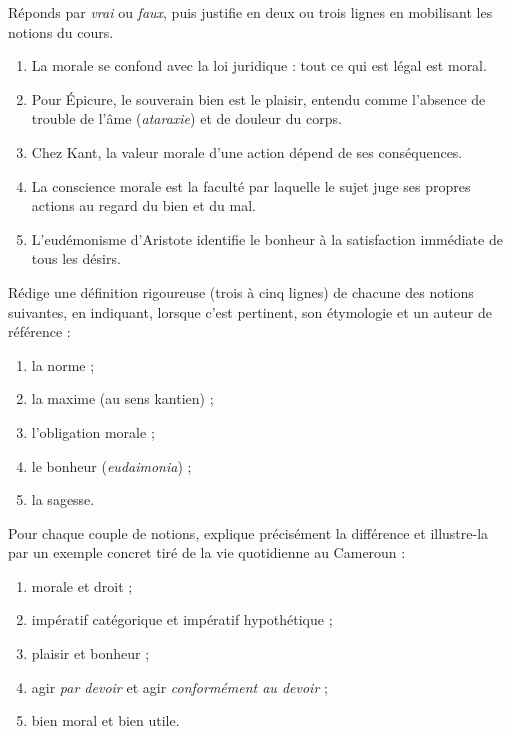 \documentclass[11pt]{article}
\newcommand{\cle}[1]{{\popxbold\color{popdark}#1}}
\begin{document}
\begin{exercice}
Réponds par \emph{vrai} ou \emph{faux}, puis justifie en deux ou trois lignes en mobilisant les notions du cours.

\begin{enumerate}
\item La morale se confond avec la loi juridique : tout ce qui est légal est moral.
\item Pour Épicure, le souverain bien est le plaisir, entendu comme l'absence de trouble de l'âme (\emph{ataraxie}) et de douleur du corps.
\item Chez Kant, la valeur morale d'une action dépend de ses conséquences.
\item La \cle{conscience morale} est la faculté par laquelle le sujet juge ses propres actions au regard du bien et du mal.
\item L'eudémonisme d'Aristote identifie le bonheur à la satisfaction immédiate de tous les désirs.
\end{enumerate}
\end{exercice}

\begin{exercice}
Rédige une définition rigoureuse (trois à cinq lignes) de chacune des notions suivantes, en indiquant, lorsque c'est pertinent, son étymologie et un auteur de référence :
\begin{enumerate}
\item la \cle{norme} ;
\item la \cle{maxime} (au sens kantien) ;
\item l'\cle{obligation} morale ;
\item le \cle{bonheur} (\emph{eudaimonia}) ;
\item la \cle{sagesse}.
\end{enumerate}
\end{exercice}

\begin{exercice}
Pour chaque couple de notions, explique précisément la différence et illustre-la par un exemple concret tiré de la vie quotidienne au Cameroun :
\begin{enumerate}
\item morale et droit ;
\item impératif catégorique et impératif hypothétique ;
\item plaisir et bonheur ;
\item agir \emph{par devoir} et agir \emph{conformément au devoir} ;
\item bien moral et bien utile.
\end{enumerate}
\end{exercice}
\end{document}
